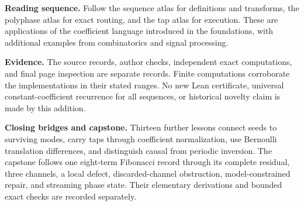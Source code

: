 \vspace{0.08in}
\textbf{Reading sequence.} Follow the sequence atlas for definitions and transforms, the polyphase atlas for exact routing, and the tap atlas for execution. These are applications of the coefficient language introduced in the foundations, with additional examples from combinatorics and signal processing.

\vspace{0.08in}
\textbf{Evidence.} The source records, author checks, independent exact computations, and final page inspection are separate records. Finite computations corroborate the implementations in their stated ranges. No new Lean certificate, universal constant-coefficient recurrence for all sequences, or historical novelty claim is made by this addition.

\textbf{Closing bridges and capstone.} Thirteen further lessons connect seeds to surviving modes, carry taps through coefficient normalization, use Bernoulli translation differences, and distinguish causal from periodic inversion. The capstone follows one eight-term Fibonacci record through its complete residual, three channels, a local defect, discarded-channel obstruction, model-constrained repair, and streaming phase state. Their elementary derivations and bounded exact checks are recorded separately.
